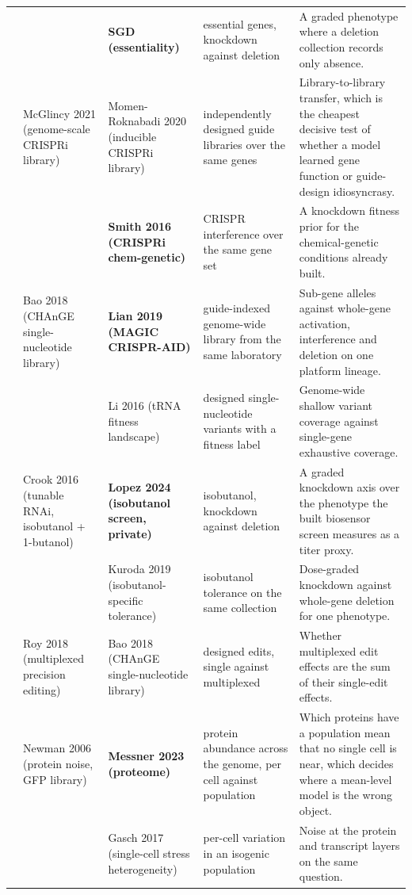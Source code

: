 \begin{landscape}
\begin{longtable}{@{}r@{\hspace{4pt}} L{42mm} L{44mm} L{48mm} L{96mm}@{}}
 &  & \textbf{SGD (essentiality)} & essential genes, knockdown against deletion & A graded phenotype where a deletion collection records only absence. \\
 & McGlincy 2021 (genome-scale CRISPRi library) & Momen-Roknabadi 2020 (inducible CRISPRi library) & independently designed guide libraries over the same genes & Library-to-library transfer, which is the cheapest decisive test of whether a model learned gene function or guide-design idiosyncrasy. \\
 &  & \textbf{Smith 2016 (CRISPRi chem-genetic)} & CRISPR interference over the same gene set & A knockdown fitness prior for the chemical-genetic conditions already built. \\
 & Bao 2018 (CHAnGE single-nucleotide library) & \textbf{Lian 2019 (MAGIC CRISPR-AID)} & guide-indexed genome-wide library from the same laboratory & Sub-gene alleles against whole-gene activation, interference and deletion on one platform lineage. \\
 &  & Li 2016 (tRNA fitness landscape) & designed single-nucleotide variants with a fitness label & Genome-wide shallow variant coverage against single-gene exhaustive coverage. \\
 & Crook 2016 (tunable RNAi, isobutanol + 1-butanol) & \textbf{Lopez 2024 (isobutanol screen, private)} & isobutanol, knockdown against deletion & A graded knockdown axis over the phenotype the built biosensor screen measures as a titer proxy. \\
 &  & Kuroda 2019 (isobutanol-specific tolerance) & isobutanol tolerance on the same collection & Dose-graded knockdown against whole-gene deletion for one phenotype. \\
 & Roy 2018 (multiplexed precision editing) & Bao 2018 (CHAnGE single-nucleotide library) & designed edits, single against multiplexed & Whether multiplexed edit effects are the sum of their single-edit effects. \\
 & Newman 2006 (protein noise, GFP library) & \textbf{Messner 2023 (proteome)} & protein abundance across the genome, per cell against population & Which proteins have a population mean that no single cell is near, which decides where a mean-level model is the wrong object. \\
 &  & Gasch 2017 (single-cell stress heterogeneity) & per-cell variation in an isogenic population & Noise at the protein and transcript layers on the same question. \\

\end{longtable}
\end{landscape}
